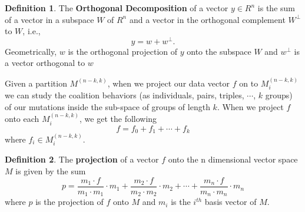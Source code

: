 \documentclass{article}
\theoremstyle{remark}
\theoremstyle{definition}
\newtheorem{definition}{Definition}[section]
\begin{document}
    \begin{definition}\cite{OrthoDecomp} The \textbf{Orthogonal     
        Decomposition} of a vector $y \in R^n$ is the sum of a vector in a subspace $W$ of $R^n$ and a vector in the orthogonal complement $W^\perp $ to $W$, i.e.,
        \begin{equation*}
            y = w + w^\perp.
        \end{equation*}
        Geometrically, $w$ is the orthogonal projection of $y$ onto the subspace $W$ and $w^\perp$ is a vector orthogonal to $w$
    \end{definition}
    Given a partition $M^{(n-k,k)}$, when we project our data vector $f$ on to $M^{(n-k,k)}_i$ we can study the coalition behaviors (as individuals, pairs, triples, $\cdots$, $k$ groups) of our mutations inside the sub-space of groups of length $k$. When we project $f$ onto each $M^{(n-k,k)}_i$, we get the following 
    \begin{equation*}
        f = f_0 + f_1 + \cdots + f_k
    \end{equation*}
    where $f_i \in M^{(n-k,k)}_i$.
    \begin{definition}\cite{cliffnotes} The \textbf{projection}
      of a vector $f$ onto the n dimensional vector space $M$ is given by the sum
      \begin{equation*}
          p = \frac{m_1\cdot f}{m_1\cdot m_1}\cdot m_1 + \frac{m_2\cdot f}{m_2\cdot m_2}\cdot m_2 + \cdots + \frac{m_n\cdot f}{m_n\cdot m_n}\cdot m_n
      \end{equation*}  
    where $p$ is the projection of $f$ onto $M$ and $m_i$ is the $i^{th}$ basis vector of $M$.
      
    \end{definition}
\end{document}
